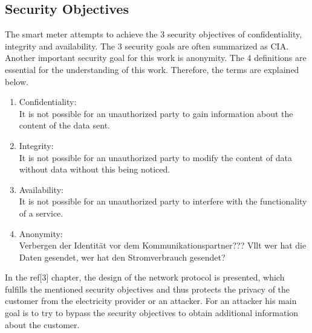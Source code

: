 \subsection{Security Objectives}

The smart meter attempts to achieve the 3 security objectives of confidentiality, integrity and availability. The 3 security goals are often summarized as CIA. Another important security goal for this work is anonymity. The 4 definitions are essential for the understanding of this work. Therefore, the terms are explained below.
\begin{enumerate}
\item Confidentiality: \\
It is not possible for an unauthorized party to gain information about the content of the data sent.
\item Integrity:\\
It is not possible for an unauthorized party to modify the content of data without data without this being noticed.
\item Availability: \\
It is not possible for an unauthorized party to interfere with the functionality of a service.
\item Anonymity:\\
Verbergen der Identität vor dem Kommunikationspartner???
Vllt wer hat die Daten gesendet, wer hat den Stromverbrauch gesendet?
\end{enumerate}
In the ref[3] chapter, the design of the network protocol is presented, which fulfills the mentioned security objectives and thus protects the privacy of the customer from the electricity provider or an attacker. For an attacker his main goal is to try to bypass the security objectives to obtain additional information about the customer.
